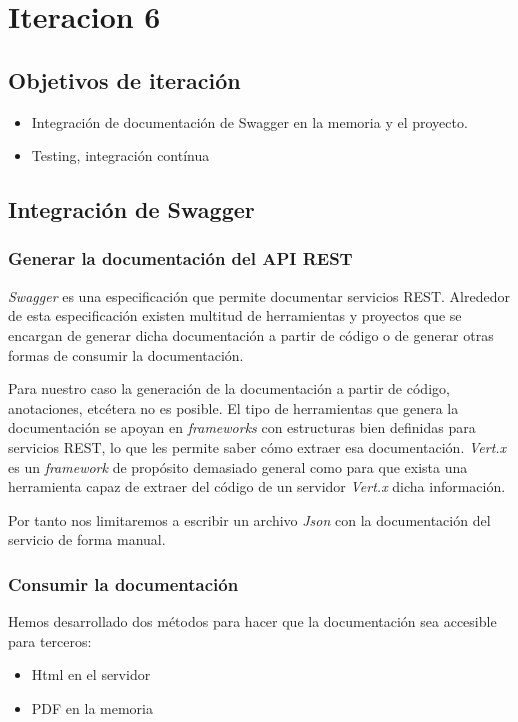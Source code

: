 \chapter{Iteracion 6}
\section{Objetivos de iteración}
\begin{itemize}
 \item Integración de documentación de Swagger en la memoria y el proyecto.
 \item Testing, integración contínua
\end{itemize} 

\section{Integración de Swagger}
\subsection{Generar la documentación del API REST}
\emph{Swagger} es una especificación que permite documentar servicios REST. Alrededor de
esta especificación existen multitud de herramientas y proyectos que se encargan de
generar dicha documentación a partir de código o de generar otras formas de consumir la
documentación.

Para nuestro caso la generación de la documentación a partir de código, anotaciones, etcétera
no es posible. El tipo de herramientas que genera la documentación se apoyan en \emph{frameworks} 
con estructuras bien definidas para servicios REST, lo que les permite saber cómo extraer esa 
documentación. \emph{Vert.x} es un \emph{framework} de propósito demasiado general como para que 
exista una herramienta capaz de extraer del código de un servidor \emph{Vert.x} dicha información.

Por tanto nos limitaremos a escribir un archivo \emph{Json} con la documentación del servicio
de forma manual.


\subsection{Consumir la documentación}
Hemos desarrollado dos métodos para hacer que la documentación sea accesible para terceros:

\begin{itemize}
 \item Html en el servidor
 \item PDF en la memoria
\end{itemize}


